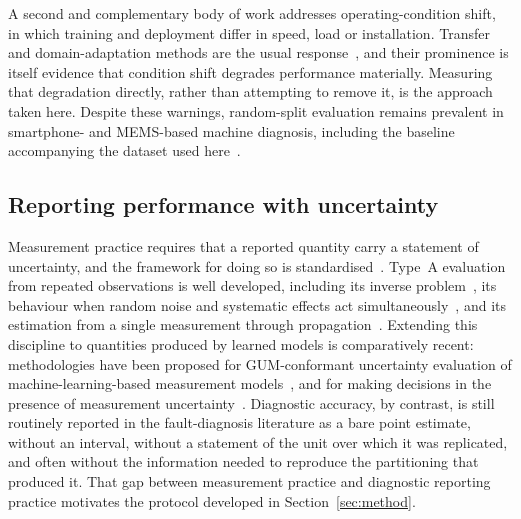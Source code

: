 A second and complementary body of work addresses operating-condition shift, in
which training and deployment differ in speed, load or installation. Transfer and
domain-adaptation methods are the usual response~\cite{qin2021domain, zou2021domain,
huang2025domain, kaya2026domain}, and their prominence is itself evidence that
condition shift degrades performance materially. Measuring that degradation
directly, rather than attempting to remove it, is the approach taken here.
Despite these warnings, random-split evaluation remains prevalent in smartphone-
and MEMS-based machine diagnosis, including the baseline accompanying the dataset
used here~\cite{ertargin2026smartphone}.

\subsection{Reporting performance with uncertainty}
Measurement practice requires that a reported quantity carry a statement of
uncertainty, and the framework for doing so is standardised~\cite{jcgm2008gum}.
Type~A evaluation from repeated observations is well developed, including its
inverse problem~\cite{dorozhovets2020uncertainty}, its behaviour when random noise
and systematic effects act simultaneously~\cite{dorozhovets2025uncertainty}, and
its estimation from a single measurement through
propagation~\cite{ou2024uncertainty}. Extending this discipline to quantities
produced by learned models is comparatively recent: methodologies have been
proposed for GUM-conformant uncertainty evaluation of machine-learning-based
measurement models~\cite{angrisani2025uncertainty}, and for making decisions in
the presence of measurement uncertainty~\cite{morello2020uncertainty}. Diagnostic
accuracy, by contrast, is still routinely reported in the fault-diagnosis
literature as a bare point estimate, without an interval, without a statement of
the unit over which it was replicated, and often without the information needed to
reproduce the partitioning that produced it. That gap between measurement practice
and diagnostic reporting practice motivates the protocol developed in
Section~\ref{sec:method}.

